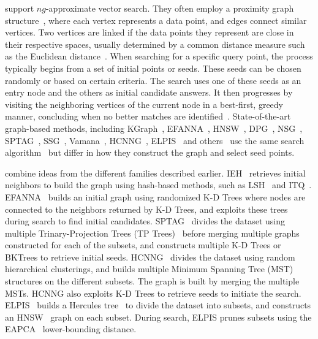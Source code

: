  support $ng$-approximate vector search. They often employ a proximity graph structure~\cite{gabriel69,toussaint02,schvaneveldt1989network}, where each vertex represents a data point, and edges connect similar vertices. Two vertices are linked if the data points they represent are close in their respective spaces, usually determined by a common distance measure such as the Euclidean distance~\cite{edelsbrunner87}. When searching for a specific query point, the process typically begins from a set of initial points or seeds. These seeds can be chosen randomly or based on certain criteria.  The search uses one of these seeds as an entry node and the others as initial candidate answers.
It then progresses by visiting the neighboring vertices of the current node in a best-first, greedy manner, concluding when no better matches are identified~\cite{reddy77bm}. State-of-the-art graph-based methods, including KGraph~\cite{kgraph}, EFANNA~\cite{efanna}, HNSW~\cite{hnsw}, DPG~\cite{dpg}, NSG~\cite{nsg}, SPTAG~\cite{tptree}, SSG~\cite{nssg}, Vamana~\cite{vamana}, HCNNG~\cite{hcnng}, ELPIS~\cite{elpis} and others~\cite{nsw14,ieh,fanng} 
use the same search algorithm~\cite{reddy77bm} but differ in how they construct the graph and select seed points.

 combine ideas from the different families described earlier. IEH~\cite{ieh} retrieves initial neighbors to build the graph using hash-based methods, such as LSH~\cite{iehlsh} and ITQ~\cite{iehitq}. EFANNA~\cite{efanna} builds an initial graph using randomized K-D Trees where nodes are connected to the neighbors returned by K-D Trees, and exploits these trees during search to find initial candidates. 
SPTAG~\cite{SPTAG4} divides the dataset using multiple Trinary-Projection Trees (TP Trees)~\cite{tptree} before merging multiple graphs constructed for each of the subsets, and constructs multiple K-D Trees or BKTrees to retrieve initial seeds. 
HCNNG~\cite{hcnng} divides the dataset using random hierarchical clusterings, and builds multiple Minimum Spanning Tree (MST) structures on the different subsets. 
The graph is built by merging the multiple MSTs. 
HCNNG also exploits K-D Trees to retrieve seeds to initiate the search. 
ELPIS~\cite{elpis} builds a Hercules tree~\cite{hercules} to divide the dataset into subsets, and constructs an HNSW~\cite{hnsw} graph on each subset. 
During search, ELPIS prunes subsets using the EAPCA~\cite{conf/vldb/Wang2013} lower-bounding distance. 

